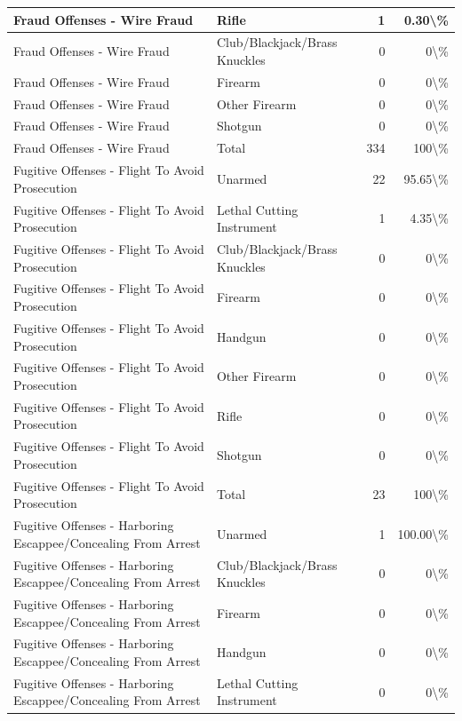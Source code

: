\documentclass[
]{krantz}
\begin{document}
\begin{longtable}[t]{l|l|r|r}
Fraud Offenses - Wire Fraud & Rifle & 1 & 0.30\textbackslash{}\%\\
\hline
Fraud Offenses - Wire Fraud & Club/Blackjack/Brass Knuckles & 0 & 0\textbackslash{}\%\\
\hline
Fraud Offenses - Wire Fraud & Firearm & 0 & 0\textbackslash{}\%\\
\hline
Fraud Offenses - Wire Fraud & Other Firearm & 0 & 0\textbackslash{}\%\\
\hline
Fraud Offenses - Wire Fraud & Shotgun & 0 & 0\textbackslash{}\%\\
\hline
Fraud Offenses - Wire Fraud & Total & 334 & 100\textbackslash{}\%\\
\hline
Fugitive Offenses - Flight To Avoid Prosecution & Unarmed & 22 & 95.65\textbackslash{}\%\\
\hline
Fugitive Offenses - Flight To Avoid Prosecution & Lethal Cutting Instrument & 1 & 4.35\textbackslash{}\%\\
\hline
Fugitive Offenses - Flight To Avoid Prosecution & Club/Blackjack/Brass Knuckles & 0 & 0\textbackslash{}\%\\
\hline
Fugitive Offenses - Flight To Avoid Prosecution & Firearm & 0 & 0\textbackslash{}\%\\
\hline
Fugitive Offenses - Flight To Avoid Prosecution & Handgun & 0 & 0\textbackslash{}\%\\
\hline
Fugitive Offenses - Flight To Avoid Prosecution & Other Firearm & 0 & 0\textbackslash{}\%\\
\hline
Fugitive Offenses - Flight To Avoid Prosecution & Rifle & 0 & 0\textbackslash{}\%\\
\hline
Fugitive Offenses - Flight To Avoid Prosecution & Shotgun & 0 & 0\textbackslash{}\%\\
\hline
Fugitive Offenses - Flight To Avoid Prosecution & Total & 23 & 100\textbackslash{}\%\\
\hline
Fugitive Offenses - Harboring Escappee/Concealing From Arrest & Unarmed & 1 & 100.00\textbackslash{}\%\\
\hline
Fugitive Offenses - Harboring Escappee/Concealing From Arrest & Club/Blackjack/Brass Knuckles & 0 & 0\textbackslash{}\%\\
\hline
Fugitive Offenses - Harboring Escappee/Concealing From Arrest & Firearm & 0 & 0\textbackslash{}\%\\
\hline
Fugitive Offenses - Harboring Escappee/Concealing From Arrest & Handgun & 0 & 0\textbackslash{}\%\\
\hline
Fugitive Offenses - Harboring Escappee/Concealing From Arrest & Lethal Cutting Instrument & 0 & 0\textbackslash{}\%\\

\end{longtable}
\end{document}
